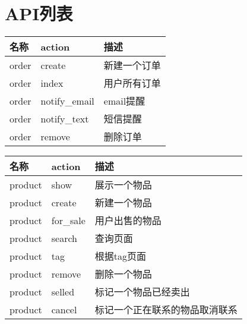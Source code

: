 \section{API列表}

\begin{center}
    \label{table:order_api_list}
    \begin{longtable}{lll}
        \toprule
        名称 & action & 描述\\
        \midrule
        order & create & 新建一个订单\\
        order & index & 用户所有订单\\
        order & notify\_email & email提醒 \\
        order & notify\_text & 短信提醒 \\
        order & remove & 删除订单 \\
        \bottomrule
    \end{longtable}
\end{center}

\begin{center}
    \label{table:product_api_list}
    \begin{longtable}{lll}
        \toprule
        名称 & action & 描述\\
        \midrule
        product & show & 展示一个物品\\
        product & create & 新建一个物品\\
        product & for\_sale & 用户出售的物品 \\
        product & search & 查询页面 \\
        product & tag & 根据tag页面 \\
        product & remove & 删除一个物品 \\
        product & selled & 标记一个物品已经卖出 \\
        product & cancel & 标记一个正在联系的物品取消联系 \\
        \bottomrule
    \end{longtable}
\end{center}
